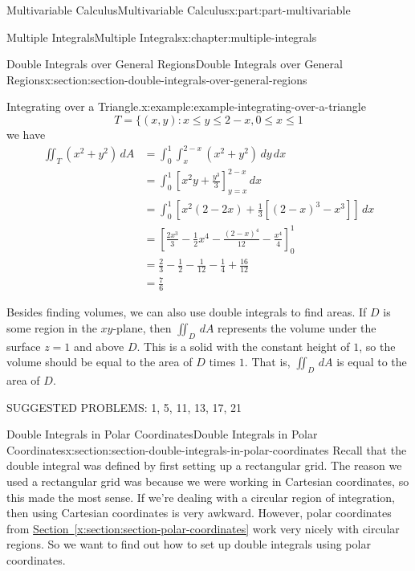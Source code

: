 \documentclass[twoside,10pt,]{tufte-book}
\newcommand{\xreffont}{\relax}
\numberwithin{equation}{part}
\begin{document}
\begin{partptx}{Multivariable Calculus}{}{Multivariable Calculus}{}{}{x:part:part-multivariable}
\begin{chapterptx}{Multiple Integrals}{}{Multiple Integrals}{}{}{x:chapter:multiple-integrals}
\begin{sectionptx}{Double Integrals over General Regions}{}{Double Integrals over General Regions}{}{}{x:section:section-double-integrals-over-general-regions}
\begin{example}{Integrating over a Triangle.}{x:example:example-integrating-over-a-triangle}
\begin{equation*}
T = \{(x,y) : x \leq y \leq 2-x, 0\leq x\leq 1
\end{equation*}
we have%
\begin{align*}
\iint_{T}(x^{2} + y^{2})\,dA & = \int_{0}^{1}\int_{x}^{2-x}(x^{2} + y^{2})\,dy\,dx \\
& = \int_{0}^{1}\left[x^{2}y + \frac{y^{3}}{3}\right]_{y=x}^{2-x}\,dx \\
& = \int_{0}^{1} \left[x^{2}(2-2x) + \frac{1}{3}[(2-x)^{3} - x^{3}]\right]\,dx \\
& = \left[\frac{2x^{3}}{3} - \frac{1}{2}x^{4} - \frac{(2-x)^{4}}{12} - \frac{x^{4}}{4}\right]_{0}^{1} \\
& = \frac{2}{3} - \frac{1}{2} - \frac{1}{12} - \frac{1}{4} + \frac{16}{12} \\
& = \frac{7}{6} 
\end{align*}
%
\end{example}
Besides finding volumes, we can also use double integrals to find areas. If \(D\) is some region in the \(xy\)-plane, then \(\iint_{D}\,dA\) represents the volume under the surface \(z=1\) and above \(D\). This is a solid with the constant height of \(1\), so the volume should be equal to the area of \(D\) times \(1\). That is, \(\iint_{D}\,dA\) is equal to the area of \(D\).%
\par
SUGGESTED PROBLEMS: 1, 5, 11, 13, 17, 21%
\end{sectionptx}
%
%
\typeout{************************************************}
\typeout{************************************************}
%
\begin{sectionptx}{Double Integrals in Polar Coordinates}{}{Double Integrals in Polar Coordinates}{}{}{x:section:section-double-integrals-in-polar-coordinates}
Recall that the double integral was defined by first setting up a rectangular grid. The reason we used a rectangular grid was because we were working in Cartesian coordinates, so this made the most sense. If we're dealing with a circular region of integration, then using Cartesian coordinates is very awkward. However, polar coordinates from \hyperref[x:section:section-polar-coordinates]{Section~{\xreffont\ref{x:section:section-polar-coordinates}}} work very nicely with circular regions. So we want to find out how to set up double integrals using polar coordinates.%
\par

\end{sectionptx}
\end{chapterptx}
\end{partptx}
\end{document}
